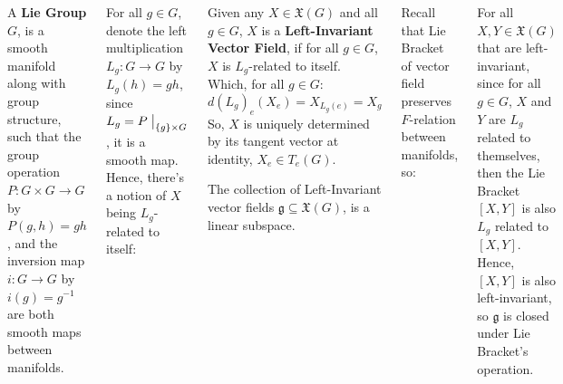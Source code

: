 \documentclass[20pt,margin=0.9in,innermargin=-4.5in,blockverticalspace=-0.25in]{tikzposter}
\begin{document}
\begin{columns}
{        \begin{definitionBox}
            A \textbf{Lie Group} $G$, is a smooth manifold along with group structure, such that the group operation $P:G\times G\rightarrow G$ by $P(g,h) = gh$, and the inversion map $i:G\rightarrow G$ by $i(g)=g^{-1}$ are both smooth maps between manifolds.
        \end{definitionBox}

        For all $g\in G$, denote the left multiplication $L_g:G\rightarrow G$ by $L_g(h)=gh$,
        since $L_g = P\bigm|_{\{g\}\times G}$, it is a smooth map. Hence, there's a notion of $X$ being $L_g$-related to itself:

        \begin{definitionBox}
            Given any $X\in\mathfrak{X}(G)$ and all $g\in G$, $X$ is a \textbf{Left-Invariant Vector Field}, if for all $g\in G$, $X$ is $L_g$-related to itself. Which, for all $g\in G$: 
            $$d(L_g)_e(X_e) = X_{L_g(e)} = X_g$$ 
            So, $X$ is uniquely determined by its tangent vector at identity, $X_e\in T_e(G)$.

            The collection of Left-Invariant vector fields $\mathfrak{g}\subseteq \mathfrak{X}(G)$, is a linear subspace. 
            
        \end{definitionBox}

        Recall that Lie Bracket of vector field preserves $F$-relation between manifolds, so:
        \begin{propertyBox}
            For all $X,Y\in\mathfrak{X}(G)$ that are left-invariant, since for all $g\in G$, $X$ and $Y$ are $L_g$ related to themselves, then the Lie Bracket $[X,Y]$ is also $L_g$ related to $[X,Y]$. Hence, $[X,Y]$ is also left-invariant, so $\mathfrak{g}$ is closed under Lie Bracket's operation.
        \end{propertyBox}
    }


\end{columns}
\end{document}
